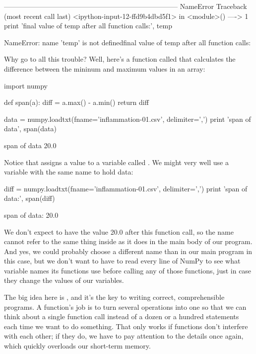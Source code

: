 \begin{VerbErr}
---------------------------------------------------------------------------
NameError                                 Traceback (most recent call last)
<ipython-input-12-ffd9b4dbd5f1> in <module>()
----> 1 print 'final value of temp after all function calls:', temp

NameError: name 'temp' is not definedfinal value of temp after all function calls:
\end{VerbErr}

Why go to all this trouble? Well, here's a function called 
that calculates the difference between the mininum and maximum values in
an array:

\begin{VerbIn}
import numpy

def span(a):
    diff = a.max() - a.min()
    return diff

data = numpy.loadtxt(fname='inflammation-01.csv', delimiter=',')
print 'span of data', span(data)
\end{VerbIn}

\begin{VerbOut}
 span of data 20.0
\end{VerbOut}

Notice that  assigns a value to a variable called
. We might very well use a variable with the same name to
hold data:

\begin{VerbIn}
diff = numpy.loadtxt(fname='inflammation-01.csv', delimiter=',')
print 'span of data:', span(diff)
\end{VerbIn}

\begin{VerbOut}
span of data: 20.0
\end{VerbOut}

We don't expect  to have the value 20.0 after this function
call, so the name  cannot refer to the same thing inside
 as it does in the main body of our program. And yes, we
could probably choose a different name than  in our main
program in this case, but we don't want to have to read every line of
NumPy to see what variable names its functions use before calling any of
those functions, just in case they change the values of our variables.

The big idea here is , and it's
the key to writing correct, comprehensible programs. A function's job is
to turn several operations into one so that we can think about a single
function call instead of a dozen or a hundred statements each time we
want to do something. That only works if functions don't interfere with
each other; if they do, we have to pay attention to the details once
again, which quickly overloads our short-term memory.

